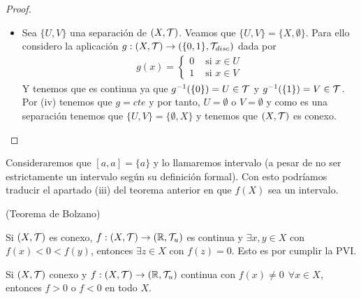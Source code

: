 \begin{teo}
\begin{proof}
\begin{itemize}
            \item[(iv)$\Rightarrow$(i) )] Sea $\{U,V\}$ una separación de $(X, \mathcal{T})$. Veamos que $\{U,V\}=\{X, \emptyset\}$. Para ello considero la aplicación $g:(X, \mathcal{T})\to (\{0,1\}, \mathcal{T}_{disc})$ dada por 
            \begin{align*}
                g(x)=\left\{
                    \begin{array}{ccc}
                        0 & \text{ si } x\in U\\
                        1 & \text{ si } x \in V
                    \end{array}
                \right.
            \end{align*}
            Y tenemos que es continua ya que $g^{-1}(\{0\})=U\in \mathcal{T}$ y $g^{-1}(\{1\})=V\in \mathcal{T}$. Por (iv) tenemos que $g=cte$ y por tanto, $U =\emptyset$ o $V=\emptyset$ y como es una separación tenemos que $\{U,V\}=\{\emptyset, X\}$ y tenemos que $(X, \mathcal{T})$ es conexo.
        \end{itemize}
    \end{proof}
\end{teo}

\begin{observacion}
    Consideraremos que $[a,a]=\{a\}$ y lo llamaremos intervalo (a pesar de no ser estrictamente un intervalo según su definición formal). Con esto podríamos traducir el apartado (iii) del teorema anterior en que $f(X)$ sea un intervalo.
    \endsquare
\end{observacion}

\begin{coro}
    (Teorema de Bolzano)
    
    Si $(X, \mathcal{T})$ es conexo, $f:(X, \mathcal{T})\to (\mathbb{R}, \mathcal{T}_u)$ es continua y $\exists x,y\in X$ con $f(x)<0<f(y)$, entonces $\exists z \in X$ con $f(z)=0$. Esto es por cumplir la PVI.
    \endsquare
\end{coro}

\begin{coro}
    Si $(X, \mathcal{T})$ conexo y $f:(X, \mathcal{T})\to (\mathbb{R}, \mathcal{T}_u)$ continua con $f(x)\neq 0\ \ \forall x \in X$, entonces $f>0$ o $f<0$ en todo $X$.
    \endsquare
\end{coro}


